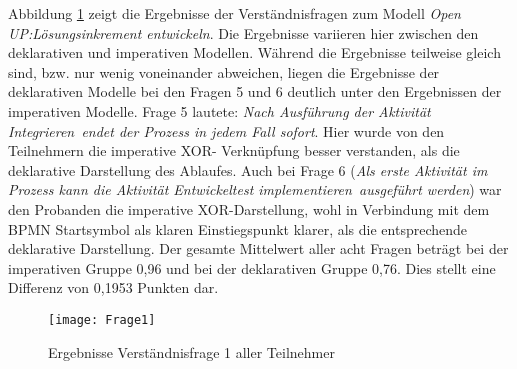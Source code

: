 Abbildung \ref{fig:Frage1} zeigt die Ergebnisse der Verständnisfragen zum Modell \textit{Open UP:Lösungsinkrement entwickeln}. Die Ergebnisse variieren hier zwischen den deklarativen und imperativen Modellen. Während die Ergebnisse teilweise gleich sind, bzw. nur wenig voneinander abweichen, liegen die Ergebnisse der deklarativen Modelle bei den Fragen 5 und 6 deutlich unter den Ergebnissen der imperativen Modelle. \newline
Frage 5 lautete: \textit{Nach Ausführung der Aktivität \grqq Integrieren\grqq \ endet der Prozess in jedem Fall sofort}. Hier wurde von den Teilnehmern die imperative XOR- Verknüpfung besser verstanden, als die deklarative Darstellung des Ablaufes. Auch bei Frage 6 (\textit{Als erste Aktivität im Prozess kann die Aktivität \grqq Entwickeltest implementieren\grqq \ ausgeführt werden}) war den Probanden die imperative XOR-Darstellung, wohl in Verbindung mit dem BPMN Startsymbol als klaren Einstiegspunkt klarer, als die entsprechende deklarative Darstellung.\newline
Der gesamte Mittelwert aller acht Fragen beträgt bei der imperativen Gruppe 0,96 und bei der deklarativen Gruppe 0,76. Dies stellt eine Differenz von 0,1953 Punkten dar. \newline

\begin{figure}[htp]
\begin{center}
  \texttt{[image: Frage1]} %
  \caption{Ergebnisse Verständnisfrage 1 aller Teilnehmer}
  \label{fig:Frage1}
\end{center}
\end{figure}


